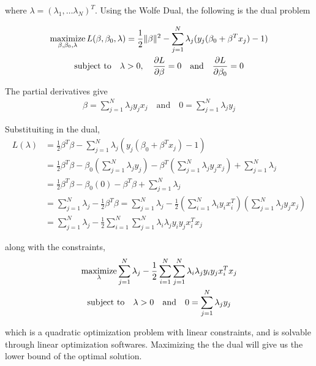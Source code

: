 \documentclass[../statistical_learning_notes.tex]{subfiles}
\begin{document}
    where $\lambda = (\lambda_{1}, \ldots \lambda_{N})^{T}$. Using the Wolfe Dual, the following is the dual problem

    \begin{gather*}
        \operatorname*{maximize}_{\beta, \beta_{0}, \lambda} L(\beta, \beta_{0}, \lambda) = \frac{1}{2}\lVert \beta \rVert^{2} - \sum_{j=1}^{N} \lambda_{j} (y_{j}(\beta_{0} + \beta^{T}x_{j}) - 1)\\
        \text{subject to} \quad \lambda > 0, \quad \frac{\partial L}{\partial \beta} = 0 \quad \text{and} \quad \frac{\partial L}{\partial \beta_{0}} = 0
    \end{gather*}

    The partial derivatives give
    \begin{align*}
        \beta = \sum_{j=1}^{N} \lambda_{j} y_{j}x_{j} \quad \text{and} \quad 0 = \sum_{j=1}^{N}\lambda_{j} y_{j}
    \end{align*}

    Substituiting in the dual,
    \begin{align*}
        L(\lambda) &= \frac{1}{2}\beta^{T} \beta - \sum_{j=1}^{N} \lambda_{j} (y_{j}(\beta_{0} + \beta^{T}x_{j}) - 1)\\
        &= \frac{1}{2}\beta^{T} \beta - \beta_{0}(\sum_{j=1}^{N} \lambda_{j} y_{j}) - \beta^{T}(\sum_{j=1}^{N} \lambda_{j} y_{j} x_{j}) + \sum_{j=1}^{N}\lambda_{j}\\
        &= \frac{1}{2}\beta^{T} \beta - \beta_{0}(0) - \beta^{T} \beta + \sum_{j=1}^{N}\lambda_{j}\\
        &= \sum_{j=1}^{N}\lambda_{j} - \frac{1}{2}\beta^{T} \beta
        = \sum_{j=1}^{N}\lambda_{j} - \frac{1}{2}(\sum_{i=1}^{N} \lambda_{i} y_{i}x_{i}^{T})(\sum_{j=1}^{N} \lambda_{j} y_{j}x_{j})\\
        &= \sum_{j=1}^{N}\lambda_{j} - \frac{1}{2} \sum_{i=1}^{N} \sum_{j=1}^{N} \lambda_{i} \lambda_{j} y_{i}y_{j}x_{i}^{T}x_{j}
    \end{align*}

    along with the constraints,
    \begin{gather*}
        \operatorname*{maximize}_{\lambda} \sum_{j=1}^{N}\lambda_{j} - \frac{1}{2} \sum_{i=1}^{N} \sum_{j=1}^{N} \lambda_{i} \lambda_{j} y_{i}y_{j}x_{i}^{T}x_{j}\\
        \text{subject to} \quad \lambda > 0 \quad \text{and} \quad 0 = \sum_{j=1}^{N}\lambda_{j} y_{j}
    \end{gather*}

    which is a quadratic optimization problem with linear constraints, and is solvable through linear optimization softwares. Maximizing the the dual will give us the lower bound of the optimal solution.\newline
\end{document}
